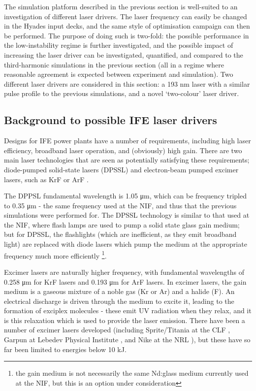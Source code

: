 The simulation platform described in the previous section is well-suited to an investigation of different laser drivers. The laser frequency can easily be changed in the Hyades input decks, and the same style of optimisation campaign can then be performed. The purpose of doing such is two-fold: the possible performance in the low-instability regime is further investigated, and the possible impact of increasing the laser driver can be investigated, quantified, and compared to the third-harmonic simulations in the previous section (all in a regime where reasonable agreement is expected between experiment and simulation). Two different laser drivers are considered in this section: a 193 \unit{\nano\meter} laser with a similar pulse profile to the previous simulations, and a novel `two-colour' laser driver.

\subsection{Background to possible IFE laser drivers}

Designs for IFE power plants have a number of requirements, including high laser efficiency, broadband laser operation, and (obviously) high gain. There are two main laser technologies that are seen as potentially satisfying these requirements; diode-pumped solid-state lasers (DPSSL) and electron-beam pumped excimer lasers, such as KrF or ArF \cite{Craxton2015}. 

The DPPSL fundamental wavelength is 1.05 \unit{\micro\meter}, which can be frequency tripled to 0.35 \unit{\micro\meter} - the same frequency used at the NIF, and thus that the previous simulations were performed for. The DPSSL technology is similar to that used at the NIF, where flash lamps are used to pump a solid state glass gain medium; but for DPSSL, the flashlights (which are inefficient, as they emit broadband light) are replaced with diode lasers which pump the medium at the appropriate frequency much more efficiently \footnote{the gain medium is not necessarily the same Nd:glass medium currently used at the NIF, but this is an option under consideration}. 

Excimer lasers are naturally higher frequency, with fundamental wavelengths of 0.258 \unit{\micro\meter} for KrF lasers and 0.193 \unit{\micro\meter} for ArF lasers. In excimer lasers, the gain medium is a gaseous mixture of a noble gas (Kr or Ar) and a halide (F). An electrical discharge is driven through the medium to excite it, leading to the formation of exciplex molecules - these emit UV radiation when they relax, and it is this relaxation which is used to provide the laser emission. There have been a number of excimer lasers developed (including Sprite/Titania at the CLF \cite{Divall1996}, Garpun at Lebedev Physical Institute \cite{Zvorykin2006}, and Nike at the NRL \cite{Obenschain1996}), but these have so far been limited to energies below 10 kJ. 


